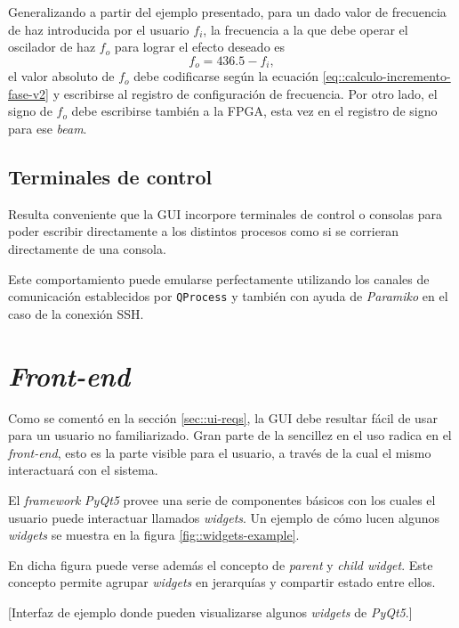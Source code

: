 \documentclass[../../main.tex]{subfiles}
\begin{document}
Generalizando a partir del ejemplo presentado, para un dado valor de frecuencia de haz introducida por el usuario $f_i$, la frecuencia a la que debe operar el oscilador de haz $f_o$ para lograr el efecto deseado es \[f_o = 436.5 - f_i,\] el valor absoluto de $f_o$ debe codificarse según la ecuación \ref{eq::calculo-incremento-fase-v2} y escribirse al registro de configuración de frecuencia. Por otro lado, el signo de $f_o$ debe escribirse también a la FPGA, esta vez en el registro de signo para ese \textit{beam}.

\subsection{Terminales de control}
Resulta conveniente que la GUI incorpore terminales de control o consolas para poder escribir directamente a los distintos procesos como si se corrieran directamente de una consola. 

Este comportamiento puede emularse perfectamente utilizando los canales de comunicación establecidos por \texttt{QProcess} y también con ayuda de \textit{Paramiko} en el caso de la conexión SSH.

\section{\textit{Front-end}}
Como se comentó en la sección \ref{sec::ui-reqs}, la GUI debe resultar fácil de usar para un usuario no familiarizado. Gran parte de la sencillez en el uso radica en el \textit{front-end}, esto es la parte visible para el usuario, a través de la cual el mismo interactuará con el sistema.

El \textit{framework} \textit{PyQt5} provee una serie de componentes básicos con los cuales el usuario puede interactuar llamados \textit{widgets}. Un ejemplo de cómo lucen algunos \textit{widgets} se muestra en la figura \ref{fig::widgets-example}. 

En dicha figura puede verse además el concepto de \textit{parent} y \textit{child widget}. Este concepto permite agrupar \textit{widgets} en jerarquías y compartir estado entre ellos.

[Interfaz de ejemplo donde pueden visualizarse algunos \textit{widgets} de \textit{PyQt5}.]
\end{document}
